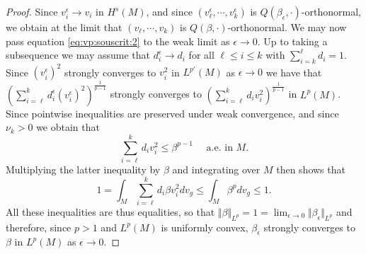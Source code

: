 \documentclass[10pt]{amsart}
\numberwithin{equation}{section}
\def\ep{{\varepsilon}}
\newcommand{\vp}{\varphi}
\def \ep{\epsilon}
\theoremstyle{plain}
\theoremstyle{remark}
\begin{document}
\begin{proof}
Since $v_i^{\ep} \to v_i$ in $H^s(M)$, and since $(v_{\ell}^\epsilon, \cdots, v_{k}^\epsilon)$ is $Q(\beta_\ep, \cdot)$-orthonormal, we obtain at the limit that $(v_\ell, \cdots, v_k)$ is $Q(\beta, \cdot)$-orthonormal.  We may now pass equation \eqref{eq:vp:souscrit:2} to the weak limit as $\epsilon \to 0$. Up to taking a subsequence we may assume that $d_i^{\ep} \to d_i$ for all $\ell \le i \le k$ with  $\sum_{i=k}^\ell d_i = 1$. 
Since $(v_i^{\epsilon})^2$ strongly converges to $v_i^2$ in $L^{p'}(M)$ as 
$\ep \to 0$ we have that $\left(\sum_{i=\ell}^{k} d_i^\ep \left(v_i^\ep\right)^2\right)^{\frac{1}{p-1}}$
 strongly converges to $\left(\sum_{i=\ell}^{k} d_i v_i ^2\right)^{\frac{1}{p-1}}$ in $L^p(M)$. 
Since pointwise inequalities are preserved under weak convergence,  and since $\nu_k >0$ we obtain that
\begin{equation} \label{eq:vp:souscrit:4} 
  \sum_{i=\ell}^{k} d_i v_i ^2 \le  \beta^{p-1} \quad \text{ a.e. in } M.
  \end{equation}
Multiplying the latter inequality by $\beta$ and integrating over $M$ then shows that 
$$ 1 = \int_M   \sum_{i=\ell}^{k} d_i \beta v_i ^2 dv_g \le \int_M \beta^{p}dv_g  \le 1. $$
All these inequalities are thus equalities, so that $\Vert \beta \Vert_{L^{p}} = 1 = \lim_{\epsilon \to 0} \Vert \beta_\epsilon \Vert_{L^{p}}$ and therefore, since $p>1$ and $L^{p}(M)$ is uniformly convex, $\beta_\epsilon$ strongly converges to $\beta$ in $L^{p}(M)$ as $\epsilon \to 0$. 

\end{proof}
\end{document}
